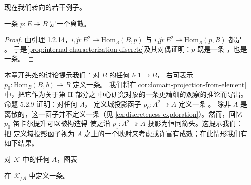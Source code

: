 现在我们转向\trDiscreteCartesianFibration{}的若干例子。

\begin{lemma}\label{lem:trivial-fibration-discrete-bifibration}
一条\trTrivialFibration{} $p\colon E\twoheadrightarrow B$ 是一个离散\trBifibration。
\end{lemma}

\begin{proof}
由引理 1.2.14，$i_{1}\hat{p}\colon E^{2}\twoheadrightarrow\mathrm{Hom}_{B}(B,p)$
与 $i_{0}\hat{p}\colon E^{2}\twoheadrightarrow\mathrm{Hom}_{B}(p,B)$ 都是%
\trTrivialFibration。
于是\cref{prop:internal-characterization-discrete}及其对偶证明：$p$ 既是一条%
\trDiscreteCartesianFibration，也是一条\trDiscreteCocartesianFibration。
\end{proof}

本章开头处的讨论提示我们：对\trInfinityCategory{} $B$ 的任何\trElement{}
$b\colon 1\to B$，
右可表示 $p_{0}\colon\mathrm{Hom}_{B}(B,b)\twoheadrightarrow B$ 定义一条\trDiscreteCartesianFibration。
我们将在\cref{cor:domain-projection-from-element}中，把它作为关于第 II 部分之%
中心研究对象的一条更精细的观察的推论而导出。命题 5.2.9 证明：对任何%
\trInfinityCategory{} $A$，
定义域投影函子 $p_{0}\colon A^{2}\twoheadrightarrow A$ 定义一条%
\trCartesianFibration。
除非 $A$ 是离散的，这一函子并不定义一条\trDiscreteCartesianFibration（见%
\cref{ex:discreteness-exploration}）。然而，回忆 $p_{0}$-笛卡尔提升可以被构造得
使之沿 $p_{1}\colon A^{2}\twoheadrightarrow A$ 投影为恒同箭头。这提示我们：把%
定义域投影函子视为 $A$ 之上的一个映射来考虑或许富有成效；在此情形我们有如下结果。

\begin{proposition}\label{prop:domain-projection-sliced}
对\trInfinityCosmos{} $\mathcal{K}$ 中的任何\trInfinityCategory{} $A$，图表
\begin{rveq}\label{eq:domain-projection-over-A}
\end{rveq}
在\trSliceInfinityCosmos{} $\mathcal{K}_{/A}$ 中定义一条\trDiscreteCartesianFibration。
\end{proposition}

